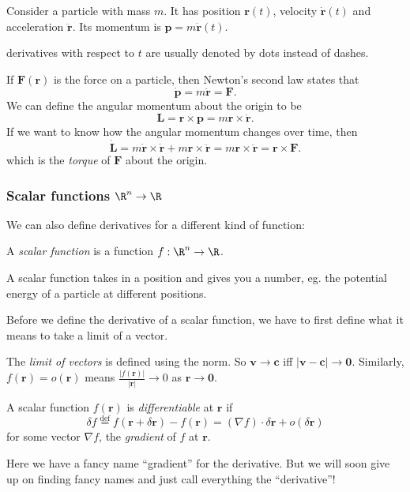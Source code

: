 \documentclass[a4paper]{article}
\begin{document}
\begin{eg}
  Consider a particle with mass $m$. It has position $\mathbf{r}(t)$, velocity $\dot{\mathbf{r}}(t)$ and acceleration $\ddot{\mathbf{r}}$. Its momentum is $\mathbf{p} = m\dot{\mathbf{r}}(t)$.

  \note derivatives with respect to $t$ are usually denoted by dots instead of dashes.

  If $\mathbf{F}(\mathbf{r})$ is the force on a particle, then Newton's second law states that
  \[
    \dot{\mathbf{p}} = m\ddot{\mathbf{r}} = \mathbf{F}.
  \]
  We can define the angular momentum about the origin to be
  \[
    \mathbf{L} = \mathbf{r}\times \mathbf{p} = m\mathbf{r} \times \dot{\mathbf{r}}.
  \]
  If we want to know how the angular momentum changes over time, then
  \[
    \dot{\mathbf{L}} = m\dot{\mathbf{r}}\times \dot{\mathbf{r}} + m\mathbf{r}\times \ddot{\mathbf{r}} = m\mathbf{r}\times \ddot{\mathbf{r}} = \mathbf{r}\times \mathbf{F}.
  \]
  which is the \emph{torque} of $\mathbf{F}$ about the origin.
\end{eg}

\subsubsection*{Scalar functions \texorpdfstring{$\R^n \to \R$}{Rn to R}}
We can also define derivatives for a different kind of function:
\begin{defi}
  A \emph{scalar function} is a function $f: \R^n \to \R$.
\end{defi}
A scalar function takes in a position and gives you a number, eg. the potential energy of a particle at different positions.

Before we define the derivative of a scalar function, we have to first define what it means to take a limit of a vector.
\begin{defi}
  The \emph{limit of vectors} is defined using the norm. So $\mathbf{v}\to \mathbf{c}$ iff $|\mathbf{v} - \mathbf{c}| \to \mathbf{0}$. Similarly, $f(\mathbf{r}) = o(\mathbf{r})$ means $\frac{|f(\mathbf{r})|}{|\mathbf{r}|} \to 0$ as $\mathbf{r}\to \mathbf{0}$.
\end{defi}

\begin{defi}
  A scalar function $f(\mathbf{r})$ is \emph{differentiable} at $\mathbf{r}$ if
  \[
    \delta f \stackrel{\text{def}}{=} f(\mathbf{r} + \delta \mathbf{r}) - f(\mathbf{r}) = (\nabla f)\cdot \delta \mathbf{r} + o(\delta \mathbf{r})
  \]
  for some vector $\nabla f$, the \emph{gradient} of $f$ at $\mathbf{r}$.
\end{defi}
Here we have a fancy name ``gradient'' for the derivative. But we will soon give up on finding fancy names and just call everything the ``derivative''!
\end{document}
